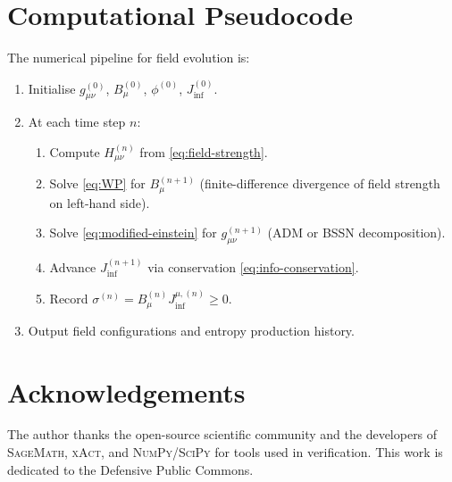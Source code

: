 \documentclass[12pt,a4paper]{article}
\newcommand{\gm}{g_{\mu\nu}}       %
\newcommand{\sigmaS}{\sigma}       %
\begin{document}
\section{Computational Pseudocode}
\label{app:code}

The numerical pipeline for field evolution is:
\begin{enumerate}
  \item Initialise $\gm^{(0)}$, $B_\mu^{(0)}$, $\phi^{(0)}$, $J_{\inf}^{(0)}$.
  \item At each time step $n$:
    \begin{enumerate}
      \item Compute $H_{\mu\nu}^{(n)}$ from \eqref{eq:field-strength}.
      \item Solve \eqref{eq:WP} for $B_\mu^{(n+1)}$ (finite-difference
            divergence of field strength on left-hand side).
      \item Solve \eqref{eq:modified-einstein} for $\gm^{(n+1)}$ (ADM
            or BSSN decomposition).
      \item Advance $J_{\inf}^{(n+1)}$ via conservation \eqref{eq:info-conservation}.
      \item Record $\sigmaS^{(n)} = B_\mu^{(n)} J_{\inf}^{\mu,(n)} \ge 0$.
    \end{enumerate}
  \item Output field configurations and entropy production history.
\end{enumerate}

\section*{Acknowledgements}

The author thanks the open-source scientific community and the developers of
\textsc{SageMath}, \textsc{xAct}, and \textsc{NumPy}/\textsc{SciPy} for tools
used in verification.  This work is dedicated to the Defensive Public Commons.


\end{document}
